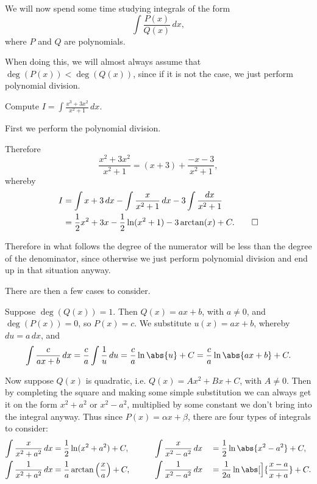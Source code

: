 
We will now spend some time studying integrals of the form
\[
	\int \frac{P(x)}{Q(x)} \, d x,
\]
where $P$ and $Q$ are polynomials.

When doing this, we will almost always assume that $\deg(P(x)) < \deg(Q(x))$, since if it is not the case, we just perform polynomial division.

\begin{example}
	Compute $I = \int \frac{x^3 + 3 x^2}{x^2 + 1} \, d x$.

	\smallskip

	First we perform the polynomial division.
	\begin{figure}[ht!]
		\centering
	\end{figure}

	\noindent
	Therefore
	\[
		\frac{x^2 + 3 x^2}{x^2 + 1} = (x + 3) + \frac{- x - 3}{x^2 + 1},
	\]
	whereby
	\begin{align*}
		I &= \int x + 3 \, d x - \int \frac{x}{x^2 + 1} \, d x - 3 \int \frac{d x}{x^2 + 1} \\
		  &= \frac{1}{2} x^2 + 3 x - \frac{1}{2} \ln(x^2 + 1) - 3 \arctan(x) + C. \qedhere
	\end{align*}
\end{example}

\noindent
Therefore in what follows the degree of the numerator will be less than the degree of the denominator, since otherwise we just perform polynomial division and end up in that situation anyway.

There are then a few cases to consider.

Suppose $\deg(Q(x)) = 1$.
Then $Q(x) = a x + b$, with $a \neq 0$, and $\deg(P(x)) = 0$, so $P(x) = c$.
We substitute $u(x) = a x + b$, whereby $d u = a \, d x$, and
\[
	\int \frac{c}{a x + b} \, d x = \frac{c}{a} \int \frac{1}{u} \, d u = \frac{c}{a} \ln\abs{u} + C = \frac{c}{a} \ln\abs{a x + b} + C.
\]

\noindent
Now suppose $Q(x)$ is quadratic, i.e. $Q(x) = A x^2 + B x + C$, with $A \neq 0$.
Then by completing the square and making some simple substitution we can always get it on the form $x^2 + a^2$ or $x^2 - a^2$, multiplied by some constant  we don't bring into the integral anyway.
Thus since $P(x) = \alpha x + \beta$, there are four types of integrals to consider:
\begin{alignat*}{5}
	\int \frac{x}{x^2 + a^2} \, d x &= \frac{1}{2} \ln(x^2 + a^2) + C, \qquad                  && \int \frac{x}{x^2 - a^2} \, d x &&= \frac{1}{2} \ln\abs{x^2 - a^2} + C, \\
	\int \frac{1}{x^2 + a^2} \, d x &= \frac{1}{a} \arctan\Big (\frac{x}{a} \Big ) + C, \qquad && \int \frac{1}{x^2 - a^2} \, d x &&= \frac{1}{2 a} \ln\abs[\Big]{\frac{x - a}{x + a}} + C.
\end{alignat*}

